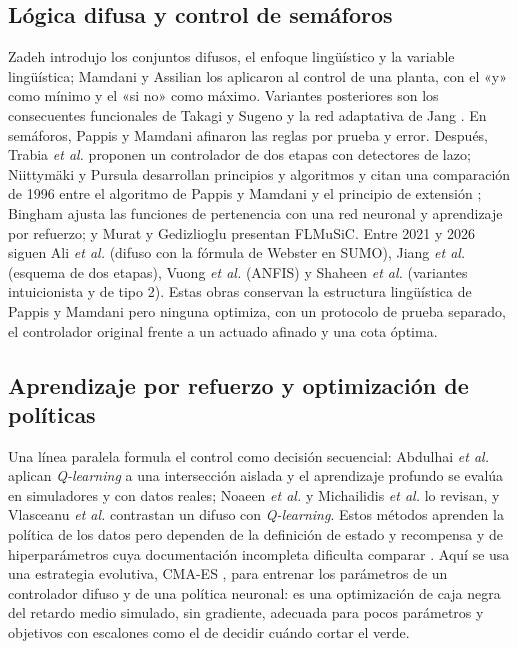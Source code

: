 \documentclass[journal]{IEEEtran}
\begin{document}
\subsection{Lógica difusa y control de semáforos}
Zadeh \cite{Zadeh1965,Zadeh1973,Zadeh1975} introdujo los conjuntos difusos, el enfoque lingüístico y la variable lingüística; Mamdani y Assilian \cite{MamdaniAssilian1975} los aplicaron al control de una planta, con el «y» como mínimo y el «si no» como máximo. Variantes posteriores son los consecuentes funcionales de Takagi y Sugeno \cite{TakagiSugeno1985} y la red adaptativa de Jang \cite{Jang1993}. En semáforos, Pappis y Mamdani \cite{Pappis1977} afinaron las reglas por prueba y error. Después, Trabia \emph{et al.} \cite{Trabia1999} proponen un controlador de dos etapas con detectores de lazo; Niittymäki y Pursula \cite{Niittymaki2000} desarrollan principios y algoritmos y citan una comparación de 1996 entre el algoritmo de Pappis y Mamdani y el principio de extensión \cite{Pursula1996}; Bingham \cite{Bingham2001} ajusta las funciones de pertenencia con una red neuronal y aprendizaje por refuerzo; y Murat y Gedizlioglu \cite{Murat2005} presentan FLMuSiC. Entre 2021 y 2026 siguen Ali \emph{et al.} \cite{Ali2021} (difuso con la fórmula de Webster en SUMO), Jiang \emph{et al.} \cite{Jiang2021} (esquema de dos etapas), Vuong \emph{et al.} \cite{Vuong2021} (ANFIS) y Shaheen \emph{et al.} \cite{Shaheen2026} (variantes intuicionista y de tipo 2). Estas obras conservan la estructura lingüística de Pappis y Mamdani pero ninguna optimiza, con un protocolo de prueba separado, el controlador original frente a un actuado afinado y una cota óptima.

\subsection{Aprendizaje por refuerzo y optimización de políticas}
Una línea paralela formula el control como decisión secuencial: Abdulhai \emph{et al.} \cite{Abdulhai2003} aplican \emph{Q-learning} a una intersección aislada y el aprendizaje profundo \cite{Mnih2015,Genders2016,Wei2018,Chu2020} se evalúa en simuladores y con datos reales; Noaeen \emph{et al.} \cite{Noaeen2022} y Michailidis \emph{et al.} \cite{Michailidis2025} lo revisan, y Vlasceanu \emph{et al.} \cite{Vlasceanu2025} contrastan un difuso con \emph{Q-learning}. Estos métodos aprenden la política de los datos pero dependen de la definición de estado y recompensa y de hiperparámetros cuya documentación incompleta dificulta comparar \cite{Henderson2018}. Aquí se usa una estrategia evolutiva, CMA-ES \cite{Hansen2001,Hansen2016}, para entrenar los parámetros de un controlador difuso y de una política neuronal: es una optimización de caja negra del retardo medio simulado, sin gradiente, adecuada para pocos parámetros y objetivos con escalones como el de decidir cuándo cortar el verde.
\end{document}
